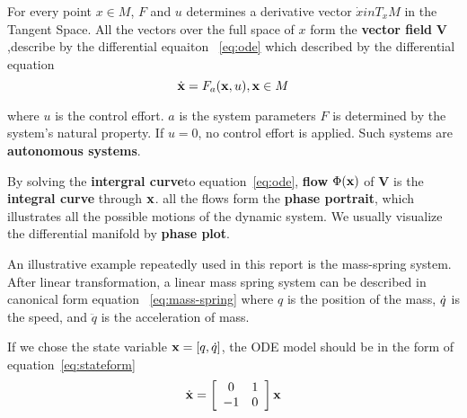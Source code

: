 For every point $x \in M$, 
$F$ and $u$ determines a derivative vector $\dot{x} in T_{x}M$ in the Tangent Space. 
All the vectors over the full space of $x$ form the \textbf{vector field} $\mathbf{V}$,describe by the differential equaiton~ \ref{eq:ode}
which described by the differential equation
\begin{equation}
\label{eq:ode}
\dot{\mathbf{x}}=F_a(\mathbf{x},u),\mathbf{x}\in M
\end{equation}

where $u$ is the control effort. 
$a$ is the system parameters
$F$ is determined by the system's natural property.
If $u=0$,  no control effort is applied.
Such systems are \textbf{autonomous systems}. 

By solving the \textbf{intergral curve}to equation~\ref{eq:ode}, 
\textbf{flow} $\Phi(\mathbf{x})$ of $\mathbf{V}$ is the \textbf{integral curve} through $\mathbf{x}$. 
all the flows form the \textbf{phase portrait}, which illustrates all the possible motions of the dynamic system.
We usually visualize the differential manifold by \textbf{phase plot}.


An illustrative example repeatedly used in this report is the mass-spring system. 
After linear transformation,  
a linear mass spring system can be described in canonical form equation ~\ref{eq:mass-spring}
where $q$ is the position of the mass, $\dot{q}$ is the speed, and $\ddot{q}$ is the acceleration of mass.
 
If we chose the state variable $\mathbf{x}=[q,\dot{q}]$, the ODE model should be in the form of equation~\ref{eq:stateform}
\begin{equation}
\label{eq:stateform}
\dot{\mathbf{x}}=
\left[ 
\begin{array}{cc}
0 &1\\
-1 &0 
\end{array}
\right]\mathbf{x}
\end{equation}



